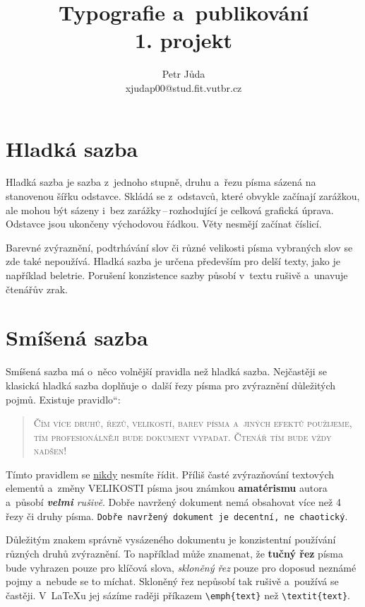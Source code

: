 \documentclass[11pt, a4paper, twocolumn]{article}
\title{Typografie a~publikování\\1. projekt}
\author{Petr Jůda\\xjudap00@stud.fit.vutbr.cz}
\date{}
\providecommand{\uv}[1]{\quotedblbase #1\textquotedblleft}
\begin{document}
\maketitle

\section{Hladká sazba}
Hladká sazba je sazba z~jednoho stupně, druhu a~řezu písma sázená na stanovenou šířku odstavce. Skládá se z~odstavců, které obvykle začínají zarážkou, ale mohou být sázeny i~bez zarážky\,--\,rozhodující je celková grafická úprava. Odstavce jsou ukončeny východovou řádkou. Věty nesmějí začínat číslicí. 

Barevné zvýraznění, podtrhávání slov či různé velikosti písma vybraných slov se zde také nepoužívá. Hladká sazba je určena především pro delší texty, jako je například beletrie. Porušení konzistence sazby působí v~textu rušivě a~unavuje čtenářův zrak.

\section{Smíšená sazba}
Smíšená sazba má o~něco volnější pravidla než hladká sazba. Nejčastěji se klasická hladká sazba doplňuje o~další řezy písma pro zvýraznění důležitých pojmů. Existuje \uv{pravidlo}:

\begin{quotation}
\textsc{Čím více druhů, řezů, velikostí, barev písma a~jiných efektů použije\-me, tím profesionálněji bude doku\-ment vypadat. Čtenář tím bude vždy nadšen!}
\end{quotation}

Tímto pravidlem se \underline{nikdy} nesmíte řídit. Příliš časté zvýrazňování textových elementů a~změny {\huge V}{\LARGE E}{\Large L}{\large I}{\normalsize K}{\small O}{\footnotesize S}{\scriptsize T}{\tiny I} písma {\Large jsou} {\LARGE známkou} {\bfseries \huge ama\-térismu} autora a~působí {\itshape \textbf{velmi} rušivě}. Dobře navržený doku\-ment nemá obsahovat více než 4 řezy či druhy písma. \texttt{Dobře navržený dokument je decentní, ne chaotický}.

Důležitým znakem správně vysázeného dokumentu je konzistentní používání různých druhů zvýraznění. To například může znamenat, že \textbf{tučný řez} písma bude vyhrazen pouze pro klíčová slova, \emph{skloněný řez} pouze pro doposud neznámé pojmy a~nebude se to míchat. Skloněný řez nepůsobí tak rušivě a~používá se častěji. V~\LaTeX u jej sázíme raději příkazem \verb|\emph{text}| než \verb|\textit{text}|.
\end{document}
